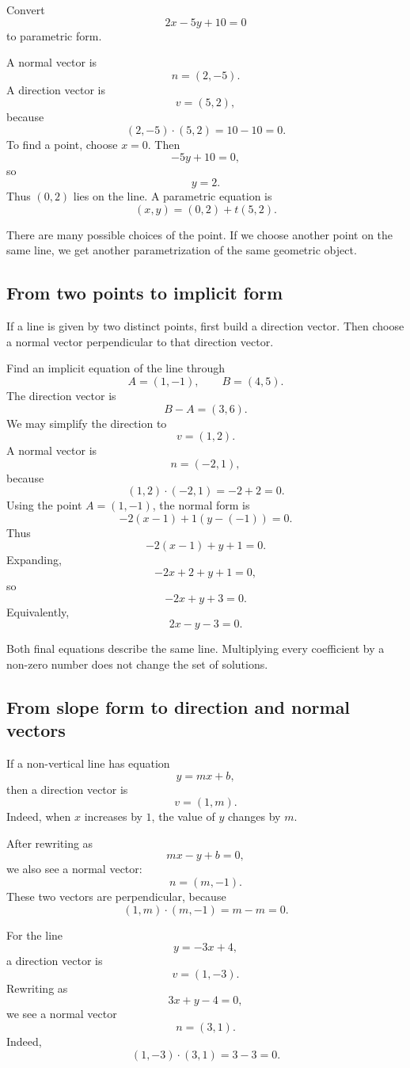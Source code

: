 \begin{examplebox}
Convert
\[
2x-5y+10=0
\]
to parametric form.

A normal vector is
\[
n=(2,-5).
\]
A direction vector is
\[
v=(5,2),
\]
because
\[
(2,-5)\cdot(5,2)=10-10=0.
\]
To find a point, choose \(x=0\). Then
\[
-5y+10=0,
\]
so
\[
y=2.
\]
Thus \((0,2)\) lies on the line. A parametric equation is
\[
(x,y)=(0,2)+t(5,2).
\]
\end{examplebox}

There are many possible choices of the point. If we choose another point on the same line, we get another parametrization of the same geometric object.

\subsection*{From two points to implicit form}

If a line is given by two distinct points, first build a direction vector. Then choose a normal vector perpendicular to that direction vector.

\begin{examplebox}
Find an implicit equation of the line through
\[
A=(1,-1),
\qquad
B=(4,5).
\]
The direction vector is
\[
B-A=(3,6).
\]
We may simplify the direction to
\[
v=(1,2).
\]
A normal vector is
\[
n=(-2,1),
\]
because
\[
(1,2)\cdot(-2,1)=-2+2=0.
\]
Using the point \(A=(1,-1)\), the normal form is
\[
-2(x-1)+1(y-(-1))=0.
\]
Thus
\[
-2(x-1)+y+1=0.
\]
Expanding,
\[
-2x+2+y+1=0,
\]
so
\[
-2x+y+3=0.
\]
Equivalently,
\[
2x-y-3=0.
\]
\end{examplebox}

Both final equations describe the same line. Multiplying every coefficient by a non-zero number does not change the set of solutions.

\subsection*{From slope form to direction and normal vectors}

If a non-vertical line has equation
\[
y=mx+b,
\]
then a direction vector is
\[
v=(1,m).
\]
Indeed, when \(x\) increases by \(1\), the value of \(y\) changes by \(m\).

After rewriting as
\[
mx-y+b=0,
\]
we also see a normal vector:
\[
n=(m,-1).
\]
These two vectors are perpendicular, because
\[
(1,m)\cdot(m,-1)=m-m=0.
\]

\begin{examplebox}
For the line
\[
y=-3x+4,
\]
a direction vector is
\[
v=(1,-3).
\]
Rewriting as
\[
3x+y-4=0,
\]
we see a normal vector
\[
n=(3,1).
\]
Indeed,
\[
(1,-3)\cdot(3,1)=3-3=0.
\]
\end{examplebox}

